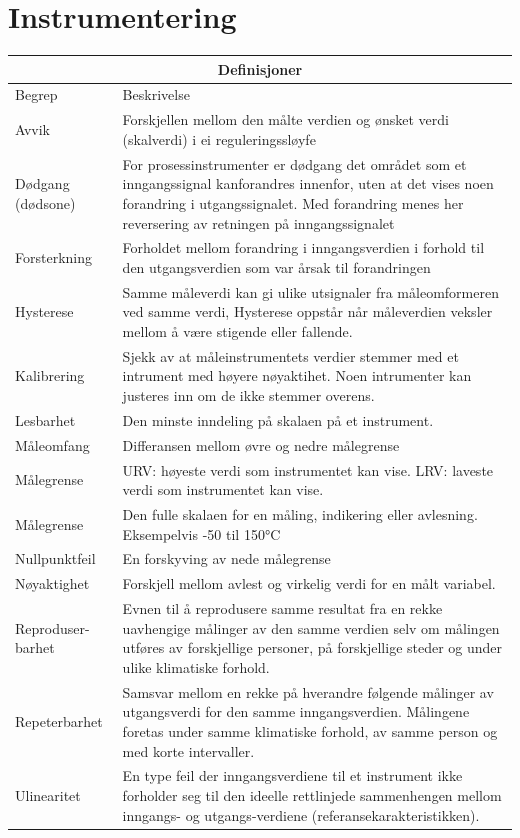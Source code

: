 
\section{Instrumentering}

\begin{center}
\begin{longtable}{ | m{2cm} | m{7cm} | } 
\hline
\multicolumn{2}{|c|}{Definisjoner} \\
\hline
Begrep	& Beskrivelse \\ 
\hline
\hline
	Avvik&Forskjellen mellom den målte verdien og ønsket verdi (skalverdi) i ei reguleringssløyfe\\
	\hline
	Dødgang (dødsone)&For prosessinstrumenter er dødgang det området som et inngangssignal kanforandres innenfor, uten at det vises noen forandring i utgangssignalet. Med forandring menes her reversering av retningen på inngangssignalet\\
	\hline
	Forsterkning&Forholdet mellom forandring i inngangsverdien i forhold til den utgangsverdien som var årsak til forandringen\\
	\hline
	Hysterese&Samme måleverdi kan gi ulike utsignaler fra måleomformeren ved samme verdi, Hysterese oppstår når måleverdien veksler mellom å være stigende eller fallende.\\
	\hline
	Kalibrering&Sjekk av at måleinstrumentets verdier stemmer med et intrument med høyere nøyaktihet. Noen intrumenter kan justeres inn om de ikke stemmer overens.\\ 
	\hline
	Lesbarhet&Den minste inndeling på skalaen på et instrument.\\
	\hline
	Måleomfang&Differansen mellom øvre og nedre målegrense\\
	\hline
	Målegrense&URV: høyeste verdi som instrumentet kan vise. LRV: laveste verdi som instrumentet kan vise. \\
	\hline
	Målegrense&Den fulle skalaen for en måling, indikering eller avlesning. Eksempelvis -50 til 150°C\\
	\hline
	Nullpunktfeil&En forskyving av nede målegrense\\
	\hline
	Nøyaktighet& Forskjell mellom avlest og virkelig verdi for en målt variabel.\\
	\hline

	Reproduser- barhet& Evnen til å reprodusere samme resultat fra en rekke uavhengige målinger av den samme verdien selv om målingen utføres av forskjellige personer, på forskjellige steder og under ulike klimatiske forhold.\\
	\hline
	Repeterbarhet&Samsvar mellom en rekke på hverandre følgende målinger av utgangsverdi for den samme inngangsverdien. Målingene foretas under samme klimatiske forhold, av samme person og med korte intervaller.\\
	\hline
	Ulinearitet&En type feil der inngangsverdiene til et instrument ikke forholder seg til den ideelle rettlinjede sammenhengen mellom inngangs- og utgangs-verdiene (referansekarakteristikken).\\
	\hline


\end{longtable}
\end{center}
